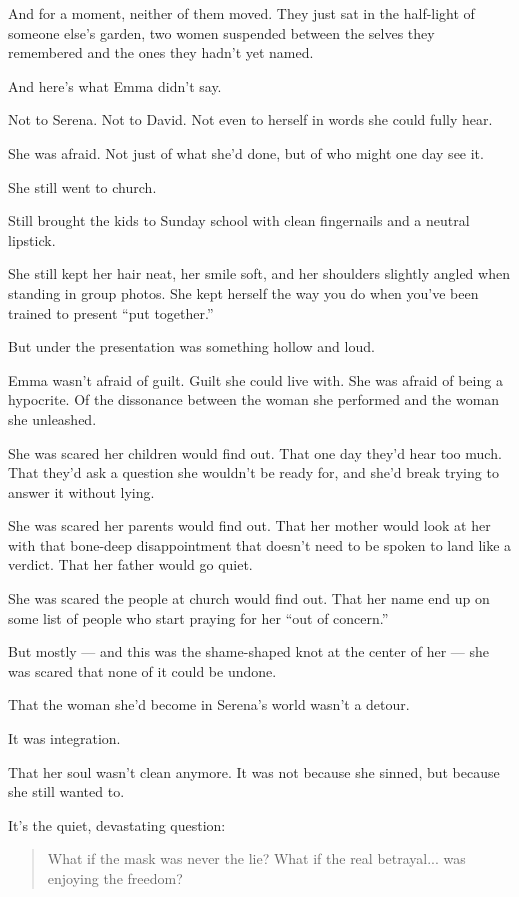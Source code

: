 And for a moment, neither of them moved. They just sat in the half-light of someone else’s garden, 
two women suspended between the selves they remembered and the ones they hadn’t yet named.

And here’s what Emma didn’t say.

Not to Serena.
Not to David.
Not even to herself in words she could fully hear.

She was afraid. Not just of what she’d done, but of who might one day see it.

She still went to church.

Still brought the kids to Sunday school with clean fingernails and a neutral lipstick.

She still kept her hair neat, her smile soft, and her shoulders slightly angled when standing in group 
photos. She kept herself the way you do when you’ve been trained to present ``put together.''

But under the presentation was something hollow and loud.

Emma wasn’t afraid of guilt. Guilt she could live with.
She was afraid of being a hypocrite.
Of the dissonance between the woman she performed and the woman she unleashed.

She was scared her children would find out.
That one day they’d hear too much. That they'd ask a question she wouldn't be ready 
for, and she'd break trying to answer it without lying.

She was scared her parents would find out.
That her mother would look at her with that bone-deep disappointment that doesn’t need to be spoken to 
land like a verdict.
That her father would go quiet.

She was scared the people at church would find out.
That her name end up on some list of people who start praying for her “out of concern.”

But mostly — and this was the shame-shaped knot at the center of her —
she was scared that none of it could be undone.

That the woman she’d become in Serena’s world wasn’t a detour.

It was integration.

That her soul wasn’t clean anymore. It was not because she sinned, but because she still wanted to.

It’s the quiet, devastating question:

\begin{quote}
What if the mask was never the lie?
What if the real betrayal... was enjoying the freedom?
\end{quote}


